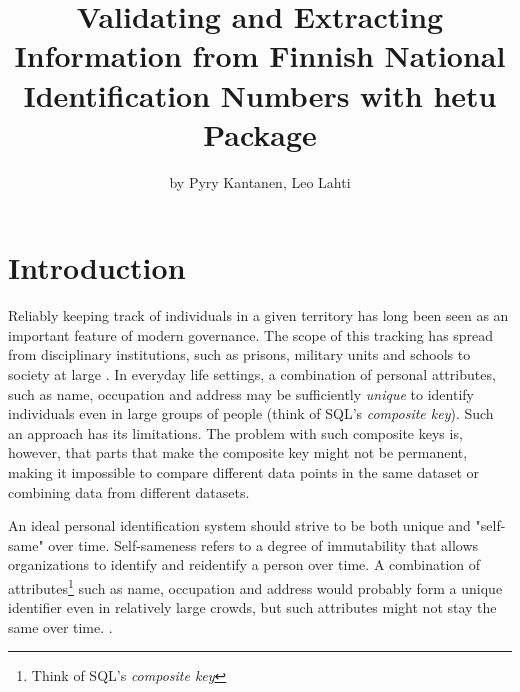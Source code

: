 \title{Validating and Extracting Information from Finnish National Identification Numbers with hetu Package}
\author{by Pyry Kantanen, Leo Lahti}

\maketitle


\section{Introduction}

Reliably keeping track of individuals in a given territory has long been seen as an important feature of modern governance. The scope of this tracking has spread from disciplinary institutions, such as prisons, military units and schools to society at large \citep{foucault7778}. In everyday life settings, a combination of personal attributes, such as name, occupation and address may be sufficiently \emph{unique} to identify individuals even in large groups of people (think of SQL's \emph{composite key}). Such an approach has its limitations. The problem with such composite keys is, however, that parts that make the composite key might not be permanent, making it impossible to compare different data points in the same dataset or combining data from different datasets. 

An ideal personal identification system should strive to be both unique and "self-same" over time. Self-sameness refers to a degree of immutability that allows organizations to identify and reidentify a person over time. A combination of attributes\footnote{Think of SQL's \emph{composite key}} such as name, occupation and address would probably form a unique identifier even in relatively large crowds, but such attributes might not stay the same over time. \citep{brensinger2021}.

